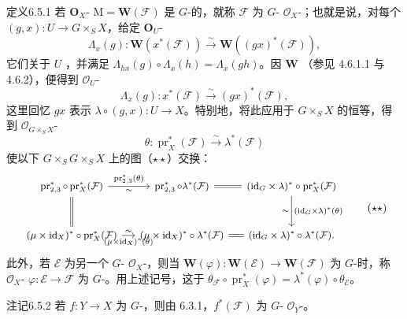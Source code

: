 \begin{SGAresult}{定义}{6.5.1}
若 $\mathbf O_X$- $\mathrm M=\mathbf W(\mathcal F)$ 是 $G$-的，就称 $\mathcal F$ 为 $G$- $\mathcal O_X$-；也就是说，对每个 $(g,x):U\to G\times_S X$，给定 $\mathbf O_U$-
\[
\Lambda_x(g):\mathbf W(x^*(\mathcal F))\xrightarrow\sim\mathbf W((gx)^*(\mathcal F)),
\]
它们关于 $U$ ，并满足 $\Lambda_{hx}(g)\circ\Lambda_x(h)=\Lambda_x(gh)$。因 $\mathbf W$ （参见 4.6.1.1 与 4.6.2），便得到 $\mathcal O_U$-
\[
\Lambda_x(g):x^*(\mathcal F)\xrightarrow\sim(gx)^*(\mathcal F),
\]
这里回忆 $gx$ 表示 $\lambda\circ(g,x):U\to X$。特别地，将此应用于 $G\times_S X$ 的恒等，得到 $\mathcal O_{G\times_S X}$-
\[
\theta:\operatorname{pr}_X^*(\mathcal F)\xrightarrow\sim\lambda^*(\mathcal F)\tag{$\star$}
\]
使以下 $G\times_S G\times_S X$ 上的图（$\star\star$）交换：
\[
\begin{tikzcd}[column sep=small,row sep=large,font=\small]
\operatorname{pr}_{2,3}^*\circ\operatorname{pr}_X^*(\mathcal F)\arrow[r,"{\operatorname{pr}_{2,3}^*(\theta)}","{\sim}"']\arrow[d,equal]&\operatorname{pr}_{2,3}^*\circ\lambda^*(\mathcal F)\arrow[r,equal]&(\mathrm{id}_G\times\lambda)^*\circ\operatorname{pr}_X^*(\mathcal F)\arrow[d,"{(\mathrm{id}_G\times\lambda)^*(\theta)}","{\sim}"']\\
(\mu\times\mathrm{id}_X)^*\circ\operatorname{pr}_X^*(\mathcal F)\arrow[r,"{(\mu\times\mathrm{id}_X)^*(\theta)}"',"{\sim}"]&(\mu\times\mathrm{id}_X)^*\circ\lambda^*(\mathcal F)\arrow[r,equal]&(\mathrm{id}_G\times\lambda)^*\circ\lambda^*(\mathcal F).
\end{tikzcd}\tag{$\star\star$}
\]
此外，若 $\mathcal E$ 为另一个 $G$- $\mathcal O_X$-，则当 $\mathbf W(\varphi):\mathbf W(\mathcal E)\to\mathbf W(\mathcal F)$ 为 $G$-时，称 $\mathcal O_X$- $\varphi:\mathcal E\to\mathcal F$ 为 $G$-。用上述记号，这于 $\theta_{\mathcal F}\circ\operatorname{pr}_X^*(\varphi)=\lambda^*(\varphi)\circ\theta_{\mathcal E}$。
\end{SGAresult}
\begin{SGAresult}{注记}{6.5.2}
若 $f:Y\to X$ 为 $G$-，则由 6.3.1，$f^*(\mathcal F)$ 为 $G$- $\mathcal O_Y$-。
\end{SGAresult}
